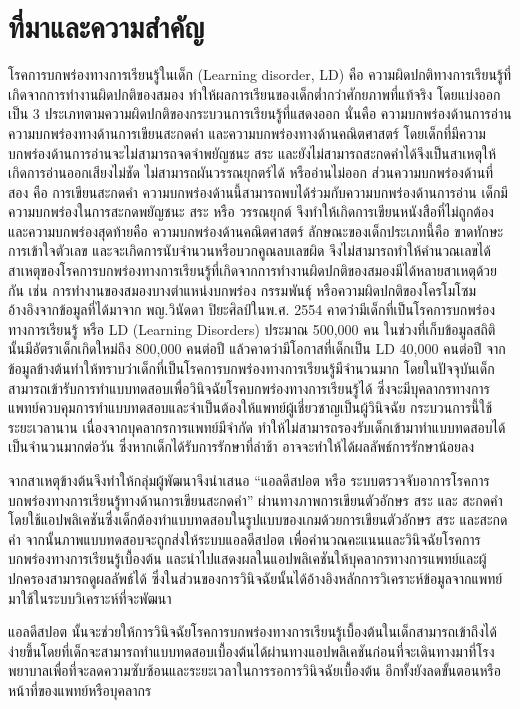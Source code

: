 \documentclass[12pt,oneside,openright,a4paper]{cpe-thai-project}
\begin{document}
\section{ที่มาและความสำคัญ}

\par โรคการบกพร่องทางการเรียนรู้ในเด็ก (Learning disorder, LD) คือ ความผิดปกติทางการเรียนรู้ที่เกิดจากการทำงานผิดปกติของสมอง ทำให้ผลการเรียนของเด็กต่ำกว่าศักยภาพที่แท้จริง โดยแบ่งออกเป็น 3 ประเภทตามความผิดปกติของกระบวนการเรียนรู้ที่แสดงออก นั่นคือ ความบกพร่องด้านการอ่าน ความบกพร่องทางด้านการเขียนสะกดคำ และความบกพร่องทางด้านคณิตศาสตร์ โดยเด็กที่มีความบกพร่องด้านการอ่านจะไม่สามารถจดจำพยัญชนะ สระ และยังไม่สามารถสะกดคำได้จึงเป็นสาเหตุให้  เกิดการอ่านออกเสียงไม่ชัด ไม่สามารถผันวรรณยุกตร์ได้ หรืออ่านไม่ออก ส่วนความบกพร่องด้านที่สอง คือ   การเขียนสะกดคำ ความบกพร่องด้านนี้สามารถพบได้ร่วมกับความบกพร่องด้านการอ่าน เด็กมีความบกพร่องในการสะกดพยัญชนะ สระ หรือ วรรณยุกต์ จึงทำให้เกิดการเขียนหนังสือที่ไม่ถูกต้อง และความบกพร่องสุดท้ายคือ ความบกพร่องด้านคณิตศาสตร์ ลักษณะของเด็กประเภทนี้คือ ขาดทักษะการเข้าใจตัวเลข และจะเกิดการนับจำนวนหรือบวกคูณลบเลขผิด จึงไม่สามารถทำให้คำนวณเลขได้ สาเหตุของโรคการบกพร่องทางการเรียนรู้ที่เกิดจากการทำงานผิดปกติของสมองมีได้หลายสาเหตุด้วยกัน เช่น การทำงานของสมองบางตำแหน่งบกพร่อง กรรมพันธุ์ หรือความผิดปกติของโครโมโซม อ้างอิงจากข้อมูลที่ได้มาจาก พญ.วินัดดา ปิยะศิลป์ในพ.ศ. 2554 คาดว่ามีเด็กที่เป็นโรคการบกพร่องทางการเรียนรู้ หรือ LD (Learning  Disorders)  ประมาณ 500,000 คน ในช่วงที่เก็บข้อมูลสถิตินั้นมีอัตราเด็กเกิดใหม่ถึง 800,000 คนต่อปี แล้วคาดว่ามีโอกาสที่เด็กเป็น LD 40,000 คนต่อปี จากข้อมูลข้างต้นทำให้ทราบว่าเด็กที่เป็นโรคการบกพร่องทางการเรียนรู้มีจำนวนมาก  โดยในปัจจุบันเด็กสามารถเข้ารับการทำแบบทดสอบเพื่อวินิจฉัยโรคบกพร่องทางการเรียนรู้ได้ ซึ่งจะมีบุคลากรทางการแพทย์ควบคุมการทำแบบทดสอบและจำเป็นต้องให้แพทย์ผู้เชี่ยวชาญเป็นผู้วินิจฉัย กระบวนการนี้ใช้ระยะเวลานาน เนื่องจากบุคลากรการแพทย์มีจำกัด ทำให้ไม่สามารถรองรับเด็กเข้ามาทำแบบทดสอบได้เป็นจำนวนมากต่อวัน ซึ่งหากเด็กได้รับการรักษาที่ล่าช้า อาจจะทำให้ได้ผลลัพธ์การรักษาน้อยลง
\par จากสาเหตุข้างต้นจึงทำให้กลุ่มผู้พัฒนาจึงนำเสนอ “แอลดีสปอต หรือ ระบบตรวจจับอาการโรคการบกพร่องทางการเรียนรู้ทางด้านการเขียนสะกดคำ” ผ่านทางภาพการเขียนตัวอักษร สระ และ สะกดคำโดยใช้แอปพลิเคชันซึ่งเด็กต้องทำแบบทดสอบในรูปแบบของเกมด้วยการเขียนตัวอักษร สระ และสะกดคำ จากนั้นภาพแบบทดสอบจะถูกส่งให้ระบบแอลดีสปอต เพื่อคำนวณคะแนนและวินิจฉัยโรคการบกพร่องทางการเรียนรู้เบื้องต้น และนำไปแสดงผลในแอปพลิเคชันให้บุคลากรทางการแพทย์และผู้ปกครองสามารถดูผลลัพธ์ได้ ซึ่งในส่วนของการวินิจฉัยนั้นได้อ้างอิงหลักการวิเคราะห์ข้อมูลจากแพทย์มาใช้ในระบบวิเคราะห์ที่จะพัฒนา
\par แอลดีสปอต นั้นจะช่วยให้การวินิจฉัยโรคการบกพร่องทางการเรียนรู้เบื้องต้นในเด็กสามารถเข้าถึงได้ง่ายขึ้นโดยที่เด็กจะสามารถทำแบบทดสอบเบื้องต้นได้ผ่านทางแอปพลิเคชันก่อนที่จะเดินทางมาที่โรงพยาบาลเพื่อที่จะลดความซับซ้อนและระยะเวลาในการรอการวินิจฉัยเบื้องต้น อีกทั้งยังลดขั้นตอนหรือหน้าที่ของแพทย์หรือบุคลากร
\end{document}
